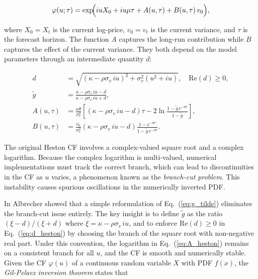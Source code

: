 \begin{equation}
    \varphi(u;\tau) = \exp\!\Bigl(iuX_0 + iu\mu\tau + A(u,\tau) + B(u,\tau)\,v_0\Bigr),
    \label{eq:cf_heston}
\end{equation}

where $X_0 = X_t$ is the current log-price, $v_0 = v_t$ is the current variance, and $\tau$ is the forecast horizon. The function $A$ captures the long-run contribution while $B$ captures the effect of the current variance. They both depend on the model parameters through an intermediate quantity $d$:

\begin{align}
    d &= \sqrt{(\kappa - \rho\sigma_v\, iu)^2 + \sigma_v^2(u^2 + iu)}, \quad \text{Re}(d) \geq 0, \label{eq:d_heston}\\
    \tilde{g} &= \frac{\kappa - \rho\sigma_v\, iu - d}{\kappa - \rho\sigma_v\, iu + d}, \label{eq:g_tilde}\\
    A(u,\tau) &= \frac{\kappa\theta}{\sigma_v^2}\left[(\kappa - \rho\sigma_v\, iu - d)\tau - 2\ln\!\frac{1 - \tilde{g}\,e^{-d\tau}}{1 - \tilde{g}}\right], \label{eq:A_heston}\\
    B(u,\tau) &= \frac{v_0}{\sigma_v^2}(\kappa - \rho\sigma_v\, iu - d)\frac{1 - e^{-d\tau}}{1 - \tilde{g}\,e^{-d\tau}}. \label{eq:B_heston}
\end{align}

The original Heston CF involves a complex-valued square root and a complex logarithm. Because the complex logarithm is multi-valued, numerical implementations must track the correct branch, which can lead to discontinuities in the CF as $u$ varies, a phenomenon known as the \textit{branch-cut problem}. This instability causes spurious oscillations in the numerically inverted PDF.

In \cite{heston:little_trap} Albrecher showed that a simple reformulation of Eq.~(\ref{eq:g_tilde}) eliminates the branch-cut issue entirely. The key insight is to define $\tilde{g}$ as the ratio $(\xi - d)/(\xi + d)$ where $\xi = \kappa - \rho\sigma_v\, iu$, and to enforce $\text{Re}(d) \geq 0$ in Eq.~(\ref{eq:d_heston}) by choosing the branch of the square root with non-negative real part. Under this convention, the logarithm in Eq.~(\ref{eq:A_heston}) remains on a consistent branch for all $u$, and the CF is smooth and numerically stable.\\




Given the CF $\varphi(u)$ of a continuous random variable $X$ with PDF $f(x)$, the \textit{Gil-Pelaez inversion theorem} \cite{heston:gil_pelaez} states that

